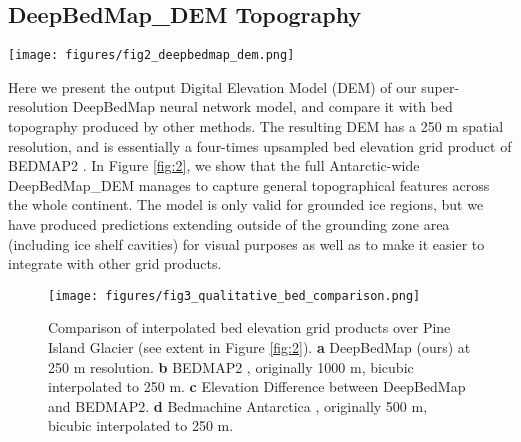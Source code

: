 \documentclass[tc, manuscript]{copernicus}
\begin{document}
\subsection{DeepBedMap\_DEM Topography}

\begin{figure*}[htbp]
    \centering
    \texttt{[image: figures/fig2\_deepbedmap\_dem.png]}
    \caption{
      DeepBedMap\_DEM over the entire Antarctic continent.
      Plotted on an Antarctic Stereographic Projection (EPSG:3031) with elevation referenced to the WGS84 datum.
      Grounding line is plotted as thin black line.
      Purple box shows Pine Island Glacier extent used in Figure \ref{fig:3}.
      Yellow box shows Thwaites Glacier extent used in Figure \ref{fig:4}
      Orange areas show locations of training tiles (see Table \ref{table:groundtruthdata}).
    }
    \label{fig:2}
\end{figure*}

Here we present the output Digital Elevation Model (DEM) of our super-resolution DeepBedMap neural network model, and compare it with bed topography produced by other methods.
The resulting DEM has a 250 m spatial resolution, and is essentially a four-times upsampled bed elevation grid product of BEDMAP2 \citep{FretwellBedmap2improvedice2013}.
In Figure \ref{fig:2}, we show that the full Antarctic-wide DeepBedMap\_DEM manages to capture general topographical features across the whole continent.
The model is only valid for grounded ice regions, but we have produced predictions extending outside of the grounding zone area (including ice shelf cavities) for visual purposes as well as to make it easier to integrate with other grid products.

\begin{figure}[htbp]
  \texttt{[image: figures/fig3\_qualitative\_bed\_comparison.png]}
  \caption{
    Comparison of interpolated bed elevation grid products over Pine Island Glacier (see extent in Figure \ref{fig:2}).
    \textbf{a} DeepBedMap (ours) at 250 m resolution.
    \textbf{b} BEDMAP2 \citep{FretwellBedmap2improvedice2013}, originally 1000 m, bicubic interpolated to 250 m.
    \textbf{c} Elevation Difference between DeepBedMap and BEDMAP2.
    \textbf{d} Bedmachine Antarctica \citep{MorlighemMEaSUREsBedMachineAntarctica2019}, originally 500 m, bicubic interpolated to 250 m.
  }
  \label{fig:3}
\end{figure}
\end{document}
